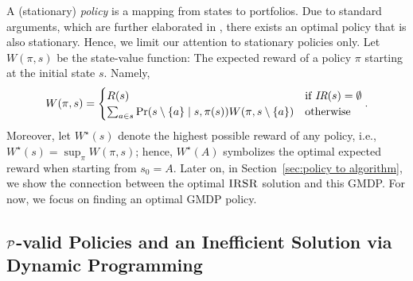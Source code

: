 A (stationary) \textit{policy} is a mapping from states to portfolios. Due to standard arguments, which are further elaborated in {\ifnum{}\fi}, there exists an optimal policy that is also stationary. Hence, we limit our attention to stationary policies only.  Let $W(\pi,s)$ be the state-value function: The expected reward of a policy $\pi$ starting at the initial state $s$. Namely, 
\begin{align}
W(\pi,s) = 
\begin{cases}
R(s) & \textnormal{if }\textit{IR}(s)=\emptyset\\
\sum_{a\in s}\Pr(s\setminus \{a\}\mid s, \pi(s)) W(\pi,s\setminus \{a\}) & \textnormal{otherwise}
\end{cases}.
\end{align}
Moreover, let $W^{\star}(s)$ denote the highest possible reward of any policy, i.e., $W^{\star}(s)=\sup_{\pi}W(\pi,s)$; hence, $W^{\star}(A)$ symbolizes the optimal expected reward when starting from $s_0=A$. Later on, in Section~\ref{sec:policy to algorithm}, we show the connection between the optimal $\textsc{IRSR}$ solution and this GMDP. For now, we focus on finding an optimal GMDP policy.






\subsection{$\mathcal{P}$-valid Policies and an Inefficient Solution via Dynamic Programming}\label{subsec:p valid inefficient}

